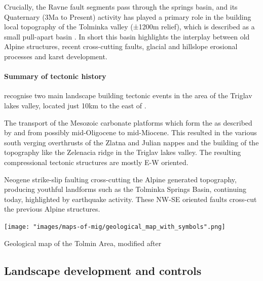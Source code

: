 Crucially, the Ravne fault segments pass through the  springs basin, and its Quaternary (3Ma to Present) activity has played a primary role in the building local topography of the Tolminka valley (±1200m relief), which is described as a small pull-apart basin \citet{cunningham2006application}. 
In short this basin highlights the interplay between old Alpine structures, recent cross-cutting faults, glacial and hillslope erosional processes and karst development.

\paragraph{Summary of tectonic history}
\label{par:summary of tectonic}
\citet{vsmuc2009tectonic} recognise two main landscape building tectonic events in the area of the Triglav lakes valley, located just 10km to the east of .

\begin{citemize}
\item The transport of the Mesozoic carbonate platforms which form the  as described by \citet{placer1998contribution} and \citet{buser1986tolmavc} from possibly mid-Oligocene to mid-Miocene. This resulted in the various south verging overthrusts of the Zlatna and Julian nappes and the building of the topography like the Zelenacia ridge in the Triglav lakes valley. The resulting compressional tectonic structures are mostly E-W oriented.
\item Neogene strike-slip faulting cross-cutting the Alpine generated topography, producing youthful landforms \citep{vsmuc2009tectonic,cunningham2006application} such as the Tolminka Springs Basin, continuing today, highlighted by earthquake activity. These NW-SE oriented faults cross-cut the previous Alpine structures.
\end{citemize}

 \begin{map*}[t!]
 \checkoddpage \ifoddpage \forcerectofloat \else \forceversofloat \fi
\centering
  \texttt{[image: "images/maps-of-mig/geological\_map\_with\_symbols".png]}
  
  \caption{Geological map of the Tolmin Area, modified after \citet{buser1986tolmavc}}
  \label{map:mapofgeology}
 \end{map*}

\subsection{Landscape development and controls}
